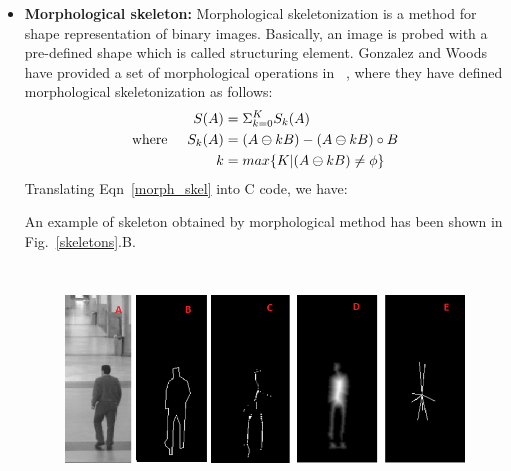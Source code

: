 \begin{itemize}
\item \textbf{Morphological skeleton:} Morphological skeletonization is
 a method  for shape representation of binary images. Basically, an
 image is probed with a pre-defined shape which is called
 structuring element. Gonzalez and Woods have provided
 a set of morphological operations in ~\cite{35}, where they have
 defined morphological skeletonization as follows:
 \begin{equation}
 \begin{aligned}
 S(A) &= \Sigma ^K _{k = 0} S_k(A) \label{morph_skel}\\
 \mathrm{where} \hspace{5 mm} S_k(A) &= (A \ominus kB) - (A \ominus kB) \circ B \\
 k &= max \{ K | (A \ominus kB) \neq \phi\}
 \end{aligned}
 \end{equation}
Translating Eqn~\ref{morph_skel} into C code, we have: \par
{} \par
\indent An example of skeleton obtained by morphological method has been
shown in Fig.~\ref{skeletons}.B.
\begin{figure}[!b]
\centering
\includegraphics[height=170pt]{Figures/skeletons}

\end{figure}
\end{itemize}
